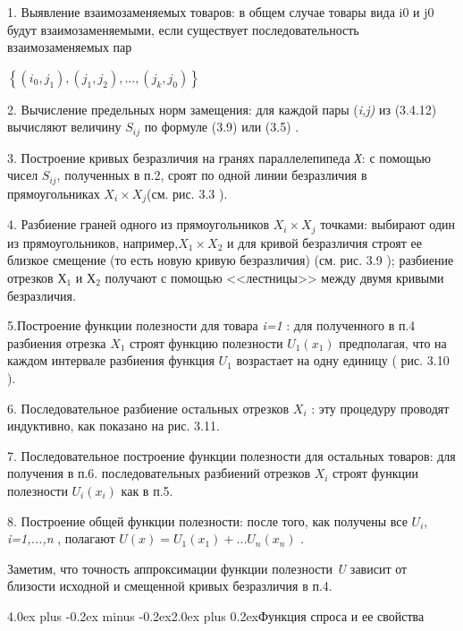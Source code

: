 \documentclass[12pt, 4paper]{book}
\makeatletter
\renewcommand{\section}{\@startsection{section}{1}{1pt}%
	{4.0ex plus -0.2ex minus -0.2ex}{2.0ex plus 0.2ex}{\centering\bf}}%
\makeatother
\begin{document}
{1.	Выявление взаимозаменяемых товаров: в общем случае товары вида i0 и j0 будут взаимозаменяемыми, если существует последовательность взаимозаменяемых пар 
\begin{center}
$\left\{(i_0,j_1),(j_1,j_2),...,(j_k,j_0)\right\}$
\end{center}
\par

2.	Вычисление предельных норм замещения: для каждой пары (\textit{i,j)} из (3.4.12) вычисляют величину $S_{ij}$ по формуле (3.9) или (3.5) . 
\par

3.	Построение кривых безразличия на гранях параллелепипеда \textit{Х}: с помощью чисел $S_{ij}$, полученных в п.2, сроят по одной линии безразличия в прямоугольниках $X_i \times X_j$(см. рис. 3.3 ). 
\par

4.	Разбиение граней одного из прямоугольников $X_i \times X_j$ точками: выбирают один из прямоугольников, например,$X_1 \times X_2 $  и для кривой безразличия строят ее близкое смещение (то есть новую кривую безразличия) (см. рис. 3.9 ); разбиение отрезков $Х_1$ и $Х_2$ получают с помощью <<лестницы>> между двумя кривыми безразличия. 
\par

5.Построение функции полезности для товара \textit{i=1} : для полученного в п.4 разбиения отрезка $X_1$ строят функцию полезности $U_1(x_1)$ предполагая, что на каждом интервале разбиения функция $U_1$ возрастает на одну единицу ( рис. 3.10 ). 
\par

6.	Последовательное разбиение остальных отрезков $X_i$ : эту процедуру проводят индуктивно, как показано на рис. 3.11. 
\par

7.	Последовательное построение функции полезности для остальных товаров: для получения в п.6. последовательных разбиений отрезков $X_i$ строят функции полезности $U_i(x_i)$ как в п.5. 
\par

8.	Построение общей функции полезности: после того, как получены все $U_i$, \textit{i=1,...,n} , полагают $U(x)= U_1(x_1)+ ... U_n(x_n)$ . 
\par

Заметим, что точность аппроксимации функции полезности \textit{U} зависит от близости исходной и смещенной кривых безразличия в п.4.
\newpage
\begin{center}
\section {Функция спроса и ее свойства}
\end{center}
\par

}
\end{document}

